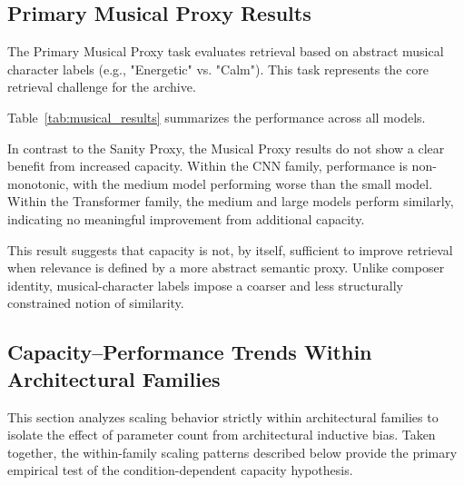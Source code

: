 \documentclass{article}
\begin{document}
\subsection{Primary Musical Proxy Results}
The Primary Musical Proxy task evaluates retrieval based on abstract musical character labels (e.g., "Energetic" vs. "Calm"). This task represents the core retrieval challenge for the archive.

Table~\ref{tab:musical_results} summarizes the performance across all models.

\begin{table}[!htbp]
\centering
\caption{Primary Musical Proxy Results (Character Retrieval). Metrics reported are corpus-level mean values at rank 5.}
\label{tab:musical_results}
\end{table}

In contrast to the Sanity Proxy, the Musical Proxy results do not show a clear benefit from increased
capacity. Within the CNN family, performance is non-monotonic, with the medium model performing worse
than the small model. Within the Transformer family,
the medium and large models perform similarly, indicating no meaningful
improvement from additional capacity.

This result suggests that capacity is not, by itself, sufficient to improve retrieval when relevance
is defined by a more abstract semantic proxy. Unlike composer identity, musical-character labels
impose a coarser and less structurally constrained notion of similarity.

\subsection{Capacity--Performance Trends Within Architectural Families}
This section analyzes scaling behavior strictly within architectural families to isolate the effect
of parameter count from architectural inductive bias. Taken together, the within-family scaling
patterns described below provide the primary empirical test of the condition-dependent capacity
hypothesis.
\end{document}
